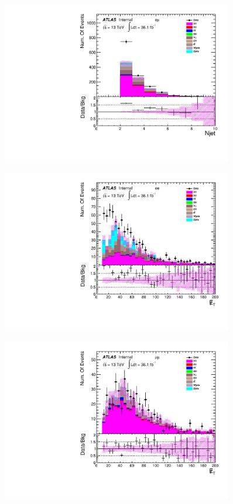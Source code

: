 \begin{figure}[h]
\begin{minipage}[t]{0.33\linewidth}
 \label{fig:nominal:numOfjet_mumu.pdf}
 \end{minipage}
\begin{minipage}[t]{0.33\linewidth}
 \centering
 \includegraphics[width=0.9\textwidth,angle=-90]{fig/nominal/numOfjet_emu.pdf}
 \label{fig:nominal:numOfjet_emu.pdf}
 \end{minipage}
\begin{minipage}[t]{0.33\linewidth}
 \centering
 \includegraphics[width=0.9\textwidth,angle=-90]{fig/nominal/MET_ee.pdf}
 \label{fig:nominal:MET_ee.pdf}
 \end{minipage}
\begin{minipage}[t]{0.33\linewidth}
 \centering
 \includegraphics[width=0.9\textwidth,angle=-90]{fig/nominal/MET_mumu.pdf}

\end{minipage}
\end{figure}
